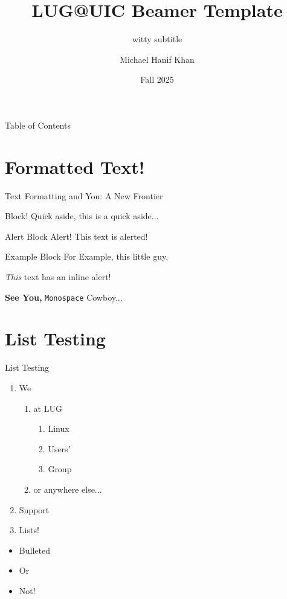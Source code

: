 \documentclass{beamer}
\title{LUG@UIC Beamer Template}
\subtitle{witty subtitle}
\date{Fall 2025}
\author{Michael Hanif Khan}
\institute{Linux Users Group @ UIC}
\begin{document}
  \begin{frame}
    \titlepage
  \end{frame}

  \begin{frame}{Table of Contents}
    \tableofcontents
  \end{frame}

  \section{Formatted Text!}
  \begin{frame}{Text Formatting and You: A New Frontier}

    \begin{block}{Block!}
     Quick aside, this is a quick aside... 
    \end{block}
    \begin{alertblock}{Alert Block}
      Alert! This text is alerted!
    \end{alertblock}
    \begin{exampleblock}{Example Block}
      For Example, this little guy.
    \end{exampleblock}

    \emph{This} text has an inline \alert{alert!}

    \textbf{See You, } \texttt{Monospace} Cowboy...
    
  \end{frame}

  \section{List Testing}
  \begin{frame}{List Testing}
    \begin{enumerate}
      \item We
        \begin{enumerate}
          \item at LUG
          \begin{enumerate}
            \item Linux
            \item Users'
            \item Group
          \end{enumerate}
          \item or anywhere else...
        \end{enumerate}
      \item Support
      \item Lists!
    \end{enumerate}
    \begin{itemize}
      \item Bulleted
      \item Or
      \item Not!
    \end{itemize}
  \end{frame}
\end{document}
